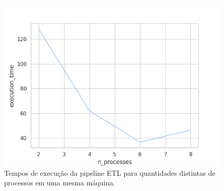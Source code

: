 \documentclass[12pt,oneside,a4paper]{article}
\begin{document}
\begin{figure} 
	\centering 
	\includegraphics[scale=.9]{../benchmarks/benchmarksprocesses.png} 
	\caption{Tempos de execução da pipeline ETL para quantidades distintas de processos em uma mesma máquina.} 
	\label{fig:local} 
\end{figure} 
\end{document}
